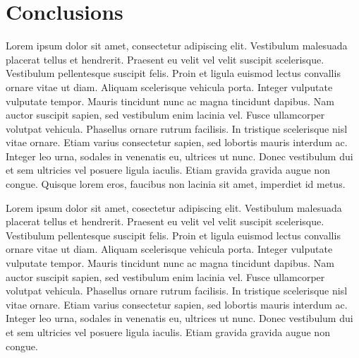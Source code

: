 \documentclass{emulateapj}
\begin{document}
	
	\section{Conclusions}
	\label{sec:conclusions}
	
	Lorem ipsum dolor sit amet, consectetur adipiscing elit. Vestibulum malesuada placerat tellus et hendrerit. Praesent eu velit vel velit suscipit scelerisque. Vestibulum pellentesque suscipit felis. Proin et ligula euismod lectus convallis ornare vitae ut diam. Aliquam scelerisque vehicula porta. Integer vulputate vulputate tempor. Mauris tincidunt nunc ac magna tincidunt dapibus. Nam auctor suscipit sapien, sed vestibulum enim lacinia vel. Fusce ullamcorper volutpat vehicula. Phasellus ornare rutrum facilisis. In tristique scelerisque nisl vitae ornare. Etiam varius consectetur sapien, sed lobortis mauris interdum ac. Integer leo urna, sodales in venenatis eu, ultrices ut nunc. Donec vestibulum dui et sem ultricies vel posuere ligula iaculis. Etiam gravida gravida augue non congue. Quisque lorem eros, faucibus non lacinia sit amet, imperdiet id metus.
	
	Lorem ipsum dolor sit amet, cosectetur adipiscing elit. Vestibulum malesuada placerat tellus et hendrerit. Praesent eu velit vel velit suscipit scelerisque. Vestibulum pellentesque suscipit felis. Proin et ligula euismod lectus convallis ornare vitae ut diam. Aliquam scelerisque vehicula porta. Integer vulputate vulputate tempor. Mauris tincidunt nunc ac magna tincidunt dapibus. Nam auctor suscipit sapien, sed vestibulum enim lacinia vel. Fusce ullamcorper volutpat vehicula. Phasellus ornare rutrum facilisis. In tristique scelerisque nisl vitae ornare. Etiam varius consectetur sapien, sed lobortis mauris interdum ac. Integer leo urna, sodales in venenatis eu, ultrices ut nunc. Donec vestibulum dui et sem ultricies vel posuere ligula iaculis. Etiam gravida gravida augue non congue. 
	


\end{document}
